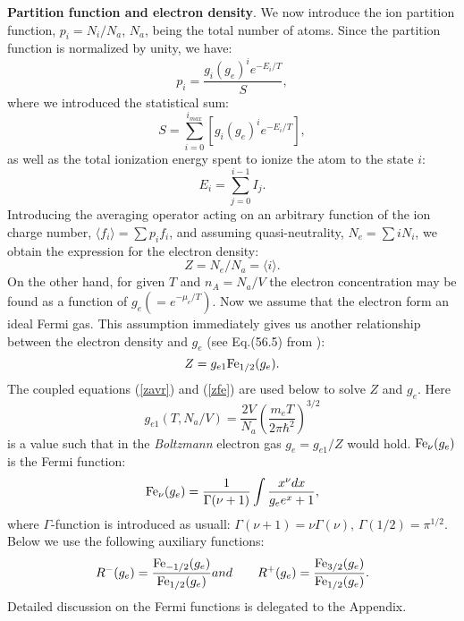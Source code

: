 {\bf Partition function and electron density}. We now introduce the ion partition function, $p_i=N_i/N_a$, $N_a$, being 
the total number of atoms. Since the partition function is normalized by unity,
we have:
\begin{equation}
p_i=\frac{g_i(g_e)^ie^{-E_i/T}}S,
\end{equation}
where we introduced the statistical sum:
\begin{equation}
S=\sum_{i=0}^{i_{max}}\left[g_i(g_e)^ie^{-E_i/T}\right],
\end{equation}
as well as the total ionization energy spent to ionize the atom to the state $i$:
\begin{equation}
E_i=\sum_{j=0}^{i-1}I_j.
\end{equation}
Introducing the averaging operator acting on an arbitrary function of the ion charge number, $\langle f_i\rangle=\sum p_if_i$, and assuming quasi-neutrality, $N_e = \sum{i N_i}$, we
obtain the expression for the electron density:
\begin{equation}\label{zavr}
Z=N_e/N_a=\langle i\rangle.
\end{equation}
On the other hand, for given $T$ and $n_A=N_a/V$ the electron concentration may be found as a function of $g_e(=e^{-\mu_e/T})$.
Now we assume that the electron form an ideal Fermi gas.
This assumption immediately gives us another relationship between the electron density and $g_e$ (see Eq.(56.5) from \cite{ll}):
\begin{equation}\label{zfe}
Z=g_{e1}{\rm Fe}_{1/2}(g_e).
\end{equation}
The coupled equations (\ref{zavr}) and (\ref{zfe}) are used below to solve $Z$ and $g_e$. Here
\begin{equation}
g_{e1}(T,N_a/V)=\frac{2V}{N_a}\left(\frac{m_eT}{2\pi \hbar^2}\right)^{3/2}
\end{equation}
is a value such that in the {\it Boltzmann} electron gas $g_e = g_{e1}/Z$ would hold. ${\rm Fe}_\nu(g_e)$ is the Fermi function:
\begin{equation}
{\rm Fe}_\nu(g_e)=\frac1{\Gamma(\nu+1)}\int{\frac{x^\nu dx}{g_ee^x+1}},
\end{equation}
where $\Gamma$-function is introduced as usuall: $\Gamma(\nu+1)=\nu \Gamma(\nu),\,\Gamma(1/2)=\pi^{1/2}$.
Below we use the following auxiliary functions:
\begin{equation}
R^-(g_e)=\frac{{\rm Fe}_{-1/2}(g_e)}{{\rm Fe}_{1/2}(g_e)} and \qquad
R^+(g_e)=\frac{{\rm Fe}_{3/2}(g_e)}{{\rm Fe}_{1/2}(g_e)}.
\end{equation}
Detailed discussion on the Fermi functions is delegated to the Appendix.

